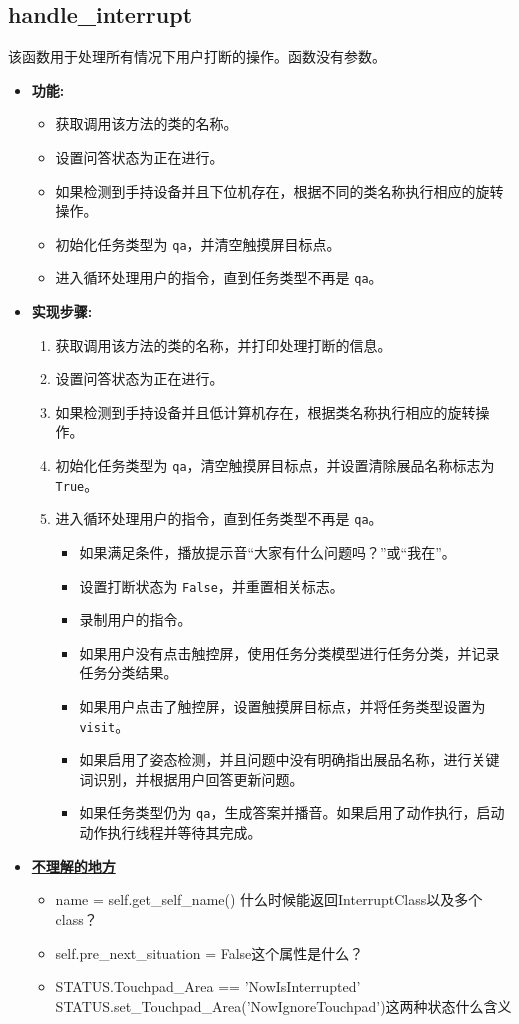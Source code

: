 \documentclass[]{article}
\begin{document}
\subsection{handle\_interrupt}
该函数用于处理所有情况下用户打断的操作。函数没有参数。

\begin{itemize}
	\item \textbf{功能:}
	\begin{itemize}
		\item 获取调用该方法的类的名称。
		\item 设置问答状态为正在进行。
		\item 如果检测到手持设备并且下位机存在，根据不同的类名称执行相应的旋转操作。
		\item 初始化任务类型为 \texttt{qa}，并清空触摸屏目标点。
		\item 进入循环处理用户的指令，直到任务类型不再是 \texttt{qa}。
	\end{itemize}
	\item \textbf{实现步骤:}
	\begin{enumerate}
		\item 获取调用该方法的类的名称，并打印处理打断的信息。
		\item 设置问答状态为正在进行。
		\item 如果检测到手持设备并且低计算机存在，根据类名称执行相应的旋转操作。
		\item 初始化任务类型为 \texttt{qa}，清空触摸屏目标点，并设置清除展品名称标志为 \texttt{True}。
		\item 进入循环处理用户的指令，直到任务类型不再是 \texttt{qa}。
		\begin{itemize}
			\item 如果满足条件，播放提示音“大家有什么问题吗？”或“我在”。
			\item 设置打断状态为 \texttt{False}，并重置相关标志。
			\item 录制用户的指令。
			\item 如果用户没有点击触控屏，使用任务分类模型进行任务分类，并记录任务分类结果。
			\item 如果用户点击了触控屏，设置触摸屏目标点，并将任务类型设置为 \texttt{visit}。
			\item 如果启用了姿态检测，并且问题中没有明确指出展品名称，进行关键词识别，并根据用户回答更新问题。
			\item 如果任务类型仍为 \texttt{qa}，生成答案并播音。如果启用了动作执行，启动动作执行线程并等待其完成。
		\end{itemize}
	\end{enumerate}
	\item \textbf{\underline{不理解的地方}}
	\begin{itemize}
		\item name = self.get\_self\_name() 什么时候能返回InterruptClass以及多个class？
		\item self.pre\_next\_situation = False这个属性是什么？
		\item STATUS.Touchpad\_Area == 'NowIsInterrupted'
\\		STATUS.set\_Touchpad\_Area('NowIgnoreTouchpad')这两种状态什么含义
	\end{itemize}
\end{itemize}
\end{document}
